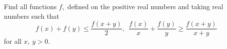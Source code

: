 Find all functions $f,$ defined on the positive real numbers and taking real numbers such that\[f(x)+f(y)\leq \frac{f(x+y)}{2},\ \ \frac{f(x)}{x}+\frac{f(y)}{y}\geq \frac{f(x+y)}{x+y}\] for all $x,\ y > 0.$
